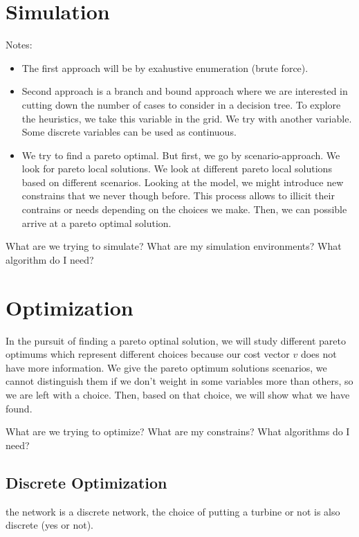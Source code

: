 \documentclass[12pt]{article}
\begin{document}
\section{Simulation}
Notes:
\begin{itemize}
\item The first approach will be by exahustive enumeration (brute force). 
\item Second approach is a branch and bound approach where we are interested in cutting down the number of cases to consider in a decision tree. To explore the heuristics, we take this variable in the grid. We try with another variable. Some discrete variables can be used as continuous. 
\item We try to find a pareto optimal. But first, we go by scenario-approach. We look for pareto local solutions. We look at different pareto local solutions based on different scenarios. Looking at the model, we might introduce new constrains that we never though before. This process allows to illicit their contrains or needs depending on the choices we make. Then, we can possible arrive at a pareto optimal solution. 
\end{itemize}

What are we trying to simulate? What are my simulation environments? What algorithm do I need?


\section{Optimization}
In the pursuit of finding a pareto optinal solution, we will study different pareto optimums which represent different choices because our cost vector  $v$ does not have more information. We give the pareto optimum solutions scenarios, we cannot distinguish them if we don't weight in some variables more than others, so we are left with a choice. Then, based on that choice, we will show what we have found. 

What are we trying to optimize? What are my constrains? What algorithms do I need?

\subsection{Discrete Optimization}
the network is a discrete network, the choice of putting a turbine or not is also
discrete (yes or not). 
\end{document}
